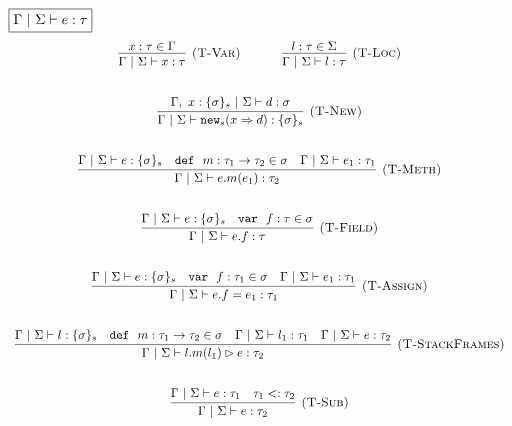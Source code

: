 \documentclass{llncs}
\newcommand{\keywadj}[1]{\mathtt{#1}}
\newcommand{\keyw}[1]{\keywadj{#1}~}
\begin{document}
$\fbox{$\Gamma~|~\Sigma \vdash e : \tau$}$
\[
\begin{array}{c}
\infer[\textsc{(T-Var)}]
  {\Gamma~|~\Sigma \vdash x : \tau}
  {x : \tau \in \Gamma}%
~~~~~~~~~~
\infer[\textsc{(T-Loc)}]
  {\Gamma~|~\Sigma \vdash l : \tau}
  {l : \tau \in \Sigma}\\[5ex]

\infer[\textsc{(T-New)}]
	{\Gamma~|~\Sigma \vdash \keywadj{new}_{s}(x \Rightarrow d) : \{ \sigma \}_{s}}
	{\Gamma,~x : \{ \sigma \}_{s}~|~\Sigma \vdash d : \sigma} \\[5ex]

\infer[\textsc{(T-Meth)}]
	{\Gamma~|~\Sigma \vdash e.m(e_1) : \tau_2} 
	{\Gamma~|~\Sigma \vdash e : \{\sigma\}_s  & \keyw{def}~ m : \tau_1 \rightarrow \tau_2 \in \sigma & \Gamma~|~\Sigma \vdash e_1 : \tau_1}\\[5ex]

\infer[\textsc{(T-Field)}]
	{\Gamma~|~\Sigma \vdash  e.f : \tau} 
	{\Gamma~|~\Sigma \vdash e : \{\sigma\}_s & \keyw{var}~ f : \tau \in \sigma}\\[5ex]
	
\infer[\textsc{(T-Assign)}]
	{\Gamma~|~\Sigma \vdash  e.f=e_1 : \tau_1} 
	{\Gamma~|~\Sigma \vdash e : \{\sigma\}_s & \keyw{var}~ f:\tau_1 \in \sigma & \Gamma~|~\Sigma \vdash e_1 : \tau_1 }\\[5ex]

\infer[\textsc{(T-StackFrames)}]
	{\Gamma~|~\Sigma \vdash l.m(l_1) \rhd e : \tau_2}
	{\Gamma~|~\Sigma \vdash l : \{\sigma\}_s & \keyw{def}~ m : \tau_1 \rightarrow \tau_2 \in \sigma & \Gamma~|~\Sigma \vdash l_1 : \tau_1 & \Gamma~|~\Sigma \vdash e : \tau_2} \\[5ex]

\infer[\textsc{(T-Sub)}]
  {\Gamma~|~\Sigma \vdash e : \tau_2}
  {\Gamma~|~\Sigma \vdash e : \tau_1 & \tau_1 <: \tau_2}\\[5ex]

\end{array}
\]
\end{document}

